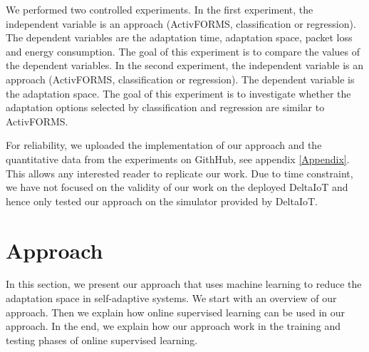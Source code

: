 \documentclass[a4paper,12pt]{article}
\begin{document}
We performed two controlled experiments. In the first experiment, the independent variable is an approach (ActivFORMS, classification or regression). The dependent variables are the adaptation time, adaptation space, packet loss and energy consumption. The goal of this experiment is to compare the values of the dependent variables. In the second experiment, the independent variable is an approach (ActivFORMS, classification or regression). The dependent variable is the adaptation space. The goal of this experiment is to investigate whether the adaptation options selected by classification and regression are similar to ActivFORMS.

For reliability, we uploaded the implementation of our approach and the quantitative data from the experiments on GithHub, see appendix \ref{Appendix}. This allows any interested reader to replicate our work. Due to time constraint, we have not focused on the validity of our work on the deployed DeltaIoT and hence only tested our approach on the simulator provided by DeltaIoT.
\newpage
\section{Approach} \label{Approach}
In this section, we present our approach that uses machine learning to reduce the adaptation space in self-adaptive systems. We start with an overview of our approach. Then we explain how online supervised learning can be used in our approach. In the end, we explain how our approach work in the training and testing phases of online supervised learning.
\end{document}
